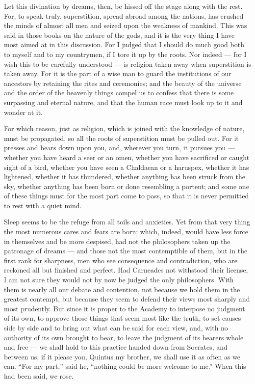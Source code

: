  Let this divination by dreams, then, be hissed off the stage along with the rest. For, to speak truly, superstition, spread abroad among the nations, has crushed the minds of almost all men and seized upon the weakness of mankind. This was said in those books on the nature of the gods, and it is the very thing I have most aimed at in this discussion. For I judged that I should do much good both to myself and to my countrymen, if I tore it up by the roots. Nor indeed — for I wish this to be carefully understood — is religion taken away when superstition is taken away. For it is the part of a wise man to guard the institutions of our ancestors by retaining the rites and ceremonies; and the beauty of the universe and the order of the heavenly things compel us to confess that there is some surpassing and eternal nature, and that the human race must look up to it and wonder at it.

 For which reason, just as religion, which is joined with the knowledge of nature, must be propagated, so all the roots of superstition must be pulled out. For it presses and bears down upon you, and, wherever you turn, it pursues you — whether you have heard a seer or an omen, whether you have sacrificed or caught sight of a bird, whether you have seen a Chaldaean or a haruspex, whether it has lightened, whether it has thundered, whether anything has been struck from the sky, whether anything has been born or done resembling a portent; and some one of these things must for the most part come to pass, so that it is never permitted to rest with a quiet mind.

 Sleep seems to be the refuge from all toils and anxieties. Yet from that very thing the most numerous cares and fears are born; which, indeed, would have less force in themselves and be more despised, had not the philosophers taken up the patronage of dreams — and those not the most contemptible of them, but in the first rank for sharpness, men who see consequence and contradiction, who are reckoned all but finished and perfect. Had Carneades not withstood their license, I am not sure they would not by now be judged the only philosophers. With them is nearly all our debate and contention, not because we hold them in the greatest contempt, but because they seem to defend their views most sharply and most prudently. But since it is proper to the Academy to interpose no judgment of its own, to approve those things that seem most like the truth, to set causes side by side and to bring out what can be said for each view, and, with no authority of its own brought to bear, to leave the judgment of its hearers whole and free — we shall hold to this practice handed down from Socrates, and between us, if it please you, Quintus my brother, we shall use it as often as we can. ``For my part,'' said he, ``nothing could be more welcome to me.'' When this had been said, we rose.
